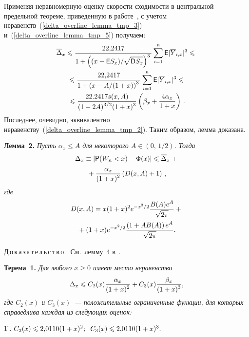 \begin{multicols}{2}
Применяя неравномерную оценку скорости сходимости в центральной
предельной теореме, приведенную в работе~\cite{GP2011}, с учетом
неравенств~(\ref{delta_overline_lemma_tmp_3}) 
и~(\ref{delta_overline_lemma_tmp_5}) получаем:
\begin{multline*}
\overline{\Delta}_x\leqslant\displaystyle\frac{\displaystyle 22{,}2417\mathstrut}{\displaystyle 1+\left((x-{\sf E}
S_x)/\sqrt{{\sf D} S_x}\right)^3\mathstrut}\sum\limits_{i=1}^n{\sf E}
|\overline{Y}_{i,x}|^3\leqslant{}\\
{}\leqslant\displaystyle\frac{\displaystyle 22{,}2417\mathstrut}{\displaystyle 1+\left(x-{A}/(1+x)\right)^3\mathstrut}
\sum\limits_{i=1}^n{\sf E}
|\overline{Y}_{i,x}|^3\leqslant{}\\
{}\leqslant\displaystyle\frac{\displaystyle 22.2417s(x,A)\mathstrut}{\displaystyle (1-2A)^{3/2}(1+x)^3\mathstrut}\left(\beta_x+\displaystyle\frac{\displaystyle 4\alpha_x\mathstrut}{\displaystyle 1+x\mathstrut}\right)\,.
\end{multline*}
Последнее, очевидно, эквивалентно неравенству~(\ref{delta_overline_lemma_tmp_2}). Таким образом, лемма доказана.

\medskip


\noindent
\textbf{Лемма~2.} %
\textit{Пусть $\alpha_x\leqslant A$ для
некоторого $A\in(0,\,1/2)$. Тогда}
\begin{multline*}
\Delta_x\equiv|{\sf P}(W_n<x)-\Phi(x)|\leqslant\overline\Delta_x+{}\\
{}+
\displaystyle\frac{\displaystyle \alpha_x\mathstrut}{\displaystyle (1+x)^2\mathstrut}\left(D(x,A)+1\right)\,,
\end{multline*}
\textit{где}
\begin{multline}
\label{D(x,A)}
D(x,A)=x(1+x)^2 e^{-x^2/2} \displaystyle\frac{\displaystyle B(A)e^A\mathstrut}{\displaystyle \sqrt{2\pi}\mathstrut}+ {}\\
{}+(1+x)
e^{-x^2/2} \displaystyle\frac{\displaystyle \left(1+AB(A)\right)e^A\mathstrut}{\displaystyle \sqrt{2\pi}\mathstrut}.
\end{multline}


\smallskip

\noindent
Д\,о\,к\,а\,з\,а\,т\,е\,л\,ь\,с\,т\,в\,о\,.\ См.~лемму~4 в~\cite{KP2011_Neam}.

\medskip

\noindent
\textbf{Терема~1.} \textit{%
Для любого $x\geqslant 0$ имеет место неравенство
$$
\Delta_x\leqslant
C_2(x)\displaystyle\frac{\displaystyle \alpha_x\mathstrut}{\displaystyle (1+x)^2\mathstrut}+C_3(x)\displaystyle\frac{\displaystyle \beta_x\mathstrut}{\displaystyle (1+x)^3\mathstrut},
$$
где $C_2(x)$ и $C_3(x)$~--- положительные ограниченные функции, для
которых справедлива каждая из следующих оценок:}

\pagebreak

\noindent\hspace*{2mm}$1^{\circ}$.
$
C_2(x)\hm\leqslant 2{,}0110(1+x)^2$;\ \,$C_3(x)\hm\leqslant 2{,}0110(1+x)^3.
$


\end{multicols}
